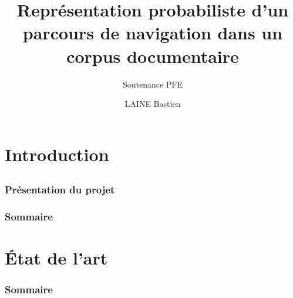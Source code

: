 \documentclass{beamer}
\title{Représentation probabiliste d’un parcours de navigation dans un corpus documentaire}
\subtitle{Soutenance PFE}
\author{LAINE Bastien}
\institute{Génie Mathématique | INSA Rouen}
\begin{document}
    \beamertemplatenavigationsymbolsempty

    \begin{frame}
        \titlepage{}
    \end{frame}

    \section{Introduction}
        \subsection{}
            \begin{frame}
                \frametitle{Présentation du projet}
            \end{frame}
            \begin{frame}
                \frametitle{Sommaire}
                \tableofcontents[hidesubsections]
            \end{frame}

    \section{État de l'art}
        \begin{frame}
            \frametitle{Sommaire}
        \end{frame}
\end{document}
